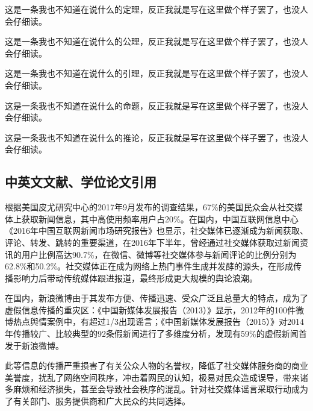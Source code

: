 \documentclass[a4paper,AutoFakeBold,oneside,12pt]{book}
\begin{document}
\begin{theorem}
这是一条我也不知道在说什么的定理，反正我就是写在这里做个样子罢了，也没人会仔细读。
\end{theorem}

\begin{axiom}
这是一条我也不知道在说什么的公理，反正我就是写在这里做个样子罢了，也没人会仔细读。
\end{axiom}

\begin{lemma}
这是一条我也不知道在说什么的引理，反正我就是写在这里做个样子罢了，也没人会仔细读。
\end{lemma}

\begin{proposition}
这是一条我也不知道在说什么的命题，反正我就是写在这里做个样子罢了，也没人会仔细读。
\end{proposition}

\begin{corollary}
这是一条我也不知道在说什么的推论，反正我就是写在这里做个样子罢了，也没人会仔细读。
\end{corollary}

\subsection{中英文文献、学位论文引用}
根据美国皮尤研究中心的2017年9月发布的调查结果\cite{pew_news_use_2017}，67\%的美国民众会从社交媒体上获取新闻信息，其中高使用频率用户占20\%。在国内，中国互联网信息中心《2016年中国互联网新闻市场研究报告》\cite{internet_news_2016}也显示，社交媒体已逐渐成为新闻获取、评论、转发、跳转的重要渠道，在2016年下半年，曾经通过社交媒体获取过新闻资讯的用户比例高达90.7\%，在微信、微博等社交媒体参与新闻评论的比例分别为62.8\%和50.2\%。社交媒体正在成为网络上热门事件生成并发酵的源头，在形成传播影响力后带动传统媒体跟进报道，最终形成更大规模的舆论浪潮。\cite{Yang2012Automatic}

在国内，新浪微博由于其发布方便、传播迅速、受众广泛且总量大的特点，成为了虚假信息传播的重灾区：《中国新媒体发展报告（2013）》\cite{唐绪军2013中国新媒体发展报告}显示，2012年的100件微博热点舆情案例中，有超过1/3出现谣言；《中国新媒体发展报告（2015）》\cite{唐绪军2015中国新媒体发展报告}对2014年传播较广、比较典型的92条假新闻进行了多维度分析，发现有59\%的虚假新闻首发于新浪微博。

此等信息的传播严重损害了有关公众人物的名誉权，降低了社交媒体服务商的商业美誉度，扰乱了网络空间秩序，冲击着网民的认知，极易对民众造成误导，带来诸多麻烦和经济损失，甚至会导致社会秩序的混乱。针对社交媒体谣言采取行动成为了有关部门、服务提供商和广大民众的共同选择。\cite{周兴2017基于深度学习的谣言检测及模式挖掘}
\end{document}
